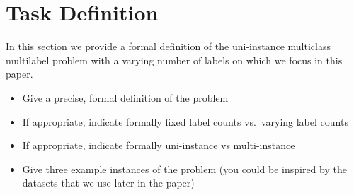
\section{Task Definition}
In this section we provide a formal definition of the uni-instance multiclass multilabel problem with a varying number of labels on which we focus in this paper.
\begin{itemize}
\item Give a precise, formal definition of the problem 
\item If appropriate, indicate formally fixed label counts vs.\ varying label counts 
\item If appropriate, indicate formally uni-instance vs multi-instance
\item Give three example instances of the problem (you could be inspired by the datasets that we use later in the paper)
\end{itemize}